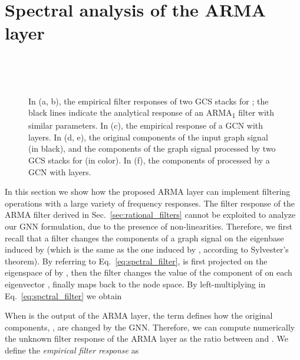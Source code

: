 \documentclass{article}
\begin{document}
\section{Spectral analysis of the ARMA layer}

\begin{figure*}[!ht]
	\centering
	~
	~

	~
	~

    \caption{\footnotesize In (a, b), the empirical filter responses of two GCS stacks for ; the black lines indicate the analytical response of an ARMA\textsubscript{1} filter with similar parameters. 
    In (c), the empirical response of a GCN with  layers. 
    In (d, e), the original components of the input graph signal  (in black), and the components of the graph signal  processed by two GCS stacks for  (in color).
    In (f), the components of  processed by a GCN with  layers.}
	\label{fig:filters}
\end{figure*}

In this section we show how the proposed ARMA layer can implement filtering operations with a large variety of frequency responses.
The filter response of the ARMA filter derived in Sec.~\ref{sec:rational_filters} cannot be exploited to analyze our GNN formulation, due to the presence of non-linearities.
Therefore, we first recall that a filter changes the components of a graph signal  on the eigenbase induced by  (which is the same as the one induced by , according to Sylvester's theorem).
By referring to Eq.~\eqref{eq:spctral_filter},  is first projected on the eigenspace of  by , then the filter  changes the value of the component of  on each eigenvector , finally  maps back to the node space.
By left-multiplying  in Eq.~\eqref{eq:spctral_filter} we obtain


When  is the output of the ARMA layer, the term  defines how the original components, , are changed by the GNN.
Therefore, we can compute numerically the unknown filter response of the ARMA layer as the ratio between  and .
We define the \textit{empirical filter response}  as
\end{document}
